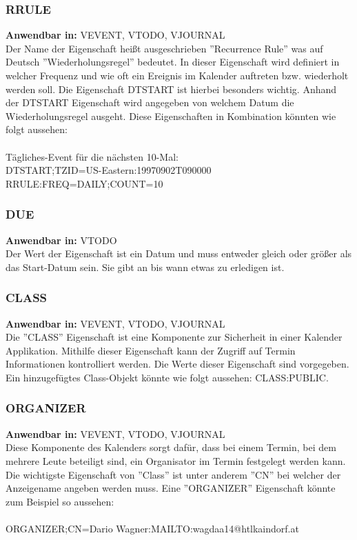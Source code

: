 \subsubsection{RRULE}
\label{sec:rrule}
\textbf{Anwendbar in:} VEVENT, VTODO, VJOURNAL \\
Der Name der Eigenschaft heißt ausgeschrieben ''Recurrence Rule'' was auf Deutsch ''Wiederholungsregel'' bedeutet. In dieser Eigenschaft wird definiert in welcher Frequenz und wie oft ein Ereignis im Kalender auftreten bzw. wiederholt werden soll. Die Eigenschaft DTSTART ist hierbei besonders wichtig. Anhand der DTSTART Eigenschaft wird angegeben von welchem Datum die Wiederholungsregel ausgeht. Diese Eigenschaften in Kombination könnten wie folgt aussehen: \\ \\
Tägliches-Event für die nächsten 10-Mal:\\
 DTSTART;TZID=US-Eastern:19970902T090000\\
 RRULE:FREQ=DAILY;COUNT=10\\
\subsubsection{DUE}
\label{sec:due}
\textbf{Anwendbar in:} VTODO\\
Der Wert der Eigenschaft ist ein Datum und muss entweder gleich oder größer als das Start-Datum sein. Sie gibt an bis wann etwas zu erledigen ist. 
\subsubsection{CLASS}
\label{sec:class}
\textbf{Anwendbar in:} VEVENT, VTODO, VJOURNAL\\
Die ''CLASS'' Eigenschaft ist eine Komponente zur Sicherheit in einer Kalender Applikation. Mithilfe dieser Eigenschaft kann der Zugriff auf Termin Informationen kontrolliert werden. Die Werte dieser Eigenschaft sind vorgegeben. Ein hinzugefügtes Class-Objekt könnte wie folgt aussehen: CLASS:PUBLIC.
\subsubsection{ORGANIZER}
\label{sec:organizer}
\textbf{Anwendbar in:} VEVENT, VTODO, VJOURNAL\\
Diese Komponente des Kalenders sorgt dafür, dass bei einem Termin, bei dem mehrere Leute beteiligt sind, ein Organisator im Termin festgelegt werden kann. Die wichtigste Eigenschaft von ''Class'' ist unter anderem ''CN'' bei welcher der Anzeigename angeben werden muss. Eine ''ORGANIZER'' Eigenschaft könnte zum Beispiel so aussehen: \\ \\ ORGANIZER;CN=Dario Wagner:MAILTO:wagdaa14@htlkaindorf.at\\

